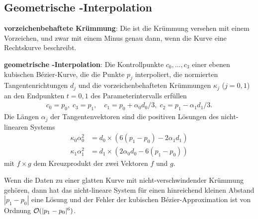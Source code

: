 \subsection{%
    Geometrische -Interpolation%
}

\textbf{vorzeichenbehaftete Krümmung}:
Die  ist die Krümmung versehen mit einem Vorzeichen,
und zwar mit einem Minus genau dann, wenn die Kurve eine Rechtskurve beschreibt.

\linie

\textbf{geometrische -Interpolation}:
Die Kontrollpunkte $c_0, \dotsc, c_3$ einer ebenen kubischen Bézier-Kurve, die die Punkte $p_j$
interpoliert, die normierten Tangentenrichtungen $d_j$ und die vorzeichenbehafteten Krümmungen
$\kappa_j$ ($j = 0, 1$) an den Endpunkten $t = 0, 1$ des Parameterintervalls erfüllen
\begin{align*}
    c_0 = p_0,\; c_3 = p_1,\quad
    c_1 = p_0 + \alpha_0 d_0 / 3,\; c_2 = p_1 - \alpha_1 d_1 / 3.
\end{align*}
Die Längen $\alpha_j$ der Tangentenvektoren sind die positiven Lösungen des nicht-linearen Systems
\begin{align*}
    \kappa_0 \alpha_0^2 &= d_0 \times (6(p_1 - p_0) - 2 \alpha_1 d_1)\\
    \kappa_1 \alpha_1^2 &= d_1 \times (2 \alpha_0 d_0 - 6(p_1 - p_0))
\end{align*}
mit $f \times g$ dem Kreuzprodukt der zwei Vektoren $f$ und $g$.

Wenn die Daten zu einer glatten Kurve mit nicht-verschwindender Krümmung gehören,
dann hat das nicht-lineare System für einen hinreichend kleinen Abstand $|p_1 - p_0|$ eine Lösung
und der Fehler der kubischen Bézier-Approximation ist von Ordnung $\mathcal{O}(|p_1 - p_0|^6)$.

\pagebreak
